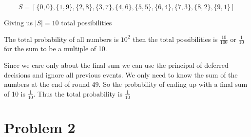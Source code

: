 \documentclass[11pt]{article}
\begin{document}
\begin{enumerate}
\[
S = [\{0,0\}, \{1,9\}, \{2,8\}, \{3,7\}, \{4,6\}, \{5, 5\}, \{6,4\}, \{7,3\}, \{8,2\}, \{9,1\}]
\]

Giving us $|S| = 10$ total possibilities

The total probability of all numbers is $10^2$ then the total possibilities is $\frac{10}{100}$ or $\frac{1}{10}$ for the sum to be a multiple of 10.

Since we care only about the final sum we can use the principal of deferred decisions and ignore all previous events. We only need to know the sum of the numbers at the end of round 49. So the probability of ending up with a final sum of 10 is $\frac{1}{10}$. Thus the total probability is $\frac{1}{10}$

\end{enumerate}


\section*{Problem 2} 
\end{document}
